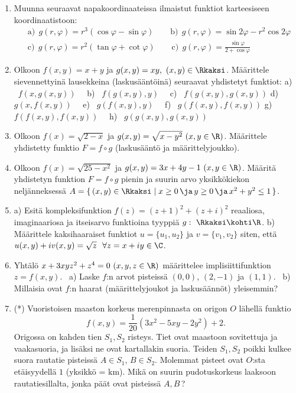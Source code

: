 \begin{enumerate}
\item
Muunna seuraavat napakoordinaateissa ilmaistut funktiot karteesiseen koordinaatistoon:
\begin{align*}
&\text{a)}\ \ g(r,\varphi)=r^3(\cos\varphi-\sin\varphi) \qquad
 \text{b)}\ \ g(r,\varphi)=\sin 2\varphi-r^2\cos 2\varphi \\
&\text{c)}\ \ g(r,\varphi)=r^2(\tan\varphi+\cot\varphi) \qquad
 \text{c)}\ \ g(r,\varphi)=\frac{\sin\varphi}{2+\cos\varphi}
\end{align*}

\item
Olkoon $f(x,y)=x+y$ ja $g(x,y)=xy,\ (x,y)\in\Rkaksi$. Määrittele sievennettyinä lausekkeina 
(laskusääntöinä) seuraavat yhdistetyt funktiot: \newline
a) \ $f(x,g(x,y))\quad$ b) \ $f(g(x,y),y)\quad$ c) \ $f(g(x,y),g(x,y))$ \newline
d) \ $g(x,f(x,y))\quad$ e) \ $g(f(x,y),y)\quad$ f) \ $g(f(x,y),f(x,y))$ \newline
g) \ $f(f(x,y),f(x,y))\quad$ h) \ $g(g(x,y),g(x,y))$

\item
Olkoon $f(x)=\sqrt{2-x}$ ja $g(x,y)=\sqrt{x-y^2}\ (x,y\in\R)$. Määrittele yhdistetty funktio
$F=f \circ g$ (laskusääntö ja määrittelyjoukko).

\item
Olkoon $f(x)=\sqrt{25-x^2}$ ja $g(x,y)=3x+4y-1\ (x,y\in\R)$. Määritä yhdistetyn funktion
$F=f \circ g$ pienin ja suurin arvo yksikkökiekon neljänneksessä
$A= \{\,(x,y)\in\Rkaksi \mid x \ge 0\,\ja\,y \ge 0\,\ja\,x^2+y^2 \le 1\,\}$.

\item
a) Esitä kompleksifunktion $f(z)=(z+1)^2+(z+i)^2$ reaaliosa, imaginaariosa ja itseisarvo
funktioina tyyppiä $g:\ \Rkaksi \kohti \R$. \vspace{1mm}\newline
b) Määrittele kaksihaaraiset funktiot $u=\{u_1,u_2\}$ ja $v=\{v_1,v_2\}$ siten, että
$u(x,y)+iv(x,y)=\sqrt{z}\ \ \forall z=x+iy\in\C$.

\item
Yhtälö $x+3xyz^2+z^4=0\ (x,y,z\in\R)$ määrittelee implisiittifunktion $z=f(x,y)$. \ a) Laske 
$f$:n arvot pisteissä $(0,0)$, $(2,-1)$ ja $(1,1)$. \ b)  Millaisia ovat $f$:n haarat 
(määrittelyjoukot ja laskusäännöt) yleisemmin?

\item (*)
Vuoristoisen maaston korkeus merenpinnasta on origon $O$ lähellä funktio
\[
f(x,y)=\frac{1}{20}(3x^2-5xy-2y^2)+2.
\]
Origossa on kahden tien $S_1,S_2$ risteys. Tiet ovat maastoon sovitettuja ja vaakasuoria, ja 
lisäksi ne ovat kartallakin suoria. Teiden $S_1,S_2$ poikki kulkee suora rautatie pisteissä
$A\in S_1$, $B\in S_2$. Molemmat pisteet ovat $O$:sta etäisyydellä $1$ (yksikkö = km).
Mikä on suurin pudotuskorkeus laaksoon rautatiesillalta, jonka päät ovat pisteissä $A,B$\,?


\end{enumerate}
